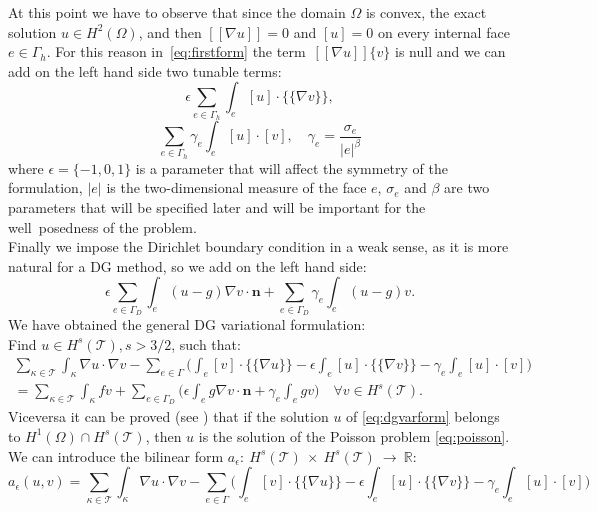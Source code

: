\documentclass[12pt, a4paper]{article}
\theoremstyle{definition}
\theoremstyle{plain}
\theoremstyle{plain}
\theoremstyle{definition}
\begin{document}
At this point we have to observe that since the domain $\Omega$ is convex, the 
exact solution $u \in H^2(\Omega)$, and then $[\![\nabla u]\!] = 0$ and $[u] = 
0$ on every internal face $e \in \Gamma_h$. For this reason 
in~\eqref{eq:firstform} the term~$[\![ \nabla u ]\!] \{v\}$ is null and we can 
add on the left hand side two tunable terms:
\begin{equation*}
	\epsilon \sum_{e \in \Gamma_h} \int_e [u] \cdot \{\!\!\{ \nabla v \}\!\!\},
\end{equation*}
\begin{equation*}
	\sum_{e \in \Gamma_h} \gamma_e \int_e [u] \cdot [v], \quad \gamma_e = 
	\frac{\sigma_e}{|e|^\beta}
\end{equation*}
where $\epsilon = \{-1, 0, 1\}$ is a parameter that will affect the symmetry of 
the formulation, $|e|$ is the two-dimensional measure of the face $e$, 
$\sigma_e$ and $\beta$ are two parameters that will be specified later and will 
be important for the well~posedness of the problem.\\
Finally we impose the Dirichlet boundary condition in a weak sense, as it is 
more natural for a DG method, so we add on the left hand side:
\begin{equation*}
	\epsilon \sum_{e \in \Gamma_D} \int_e (u-g) \nabla v \cdot \mathbf{n}
	+ \sum_{e \in \Gamma_D} \gamma_e \int_e (u-g)v.
\end{equation*}
We have obtained the general DG variational formulation:\\
Find $u \in H^s(\mathcal{T}), s>3/2$, such that:
\begin{multline*}
	\sum_{\kappa \in \mathcal{T}} \int_\kappa \nabla u \cdot \nabla v 
	-\sum_{e \in \Gamma} \bigg( \int_e [v] \cdot \{\!\!\{ \nabla u \}\!\!\}
	-\epsilon \int_e [u] \cdot \{\!\!\{ \nabla v \}\!\!\}
	- \gamma_e \int_e [u] \cdot [v] \bigg)\\
	= \sum_{\kappa \in \mathcal{T}} \int_\kappa fv
	+ \sum_{e \in \Gamma_D} \bigg( \epsilon \int_e g \nabla v \cdot \mathbf{n}
	+ \gamma_e \int_e gv \bigg) \quad \forall v \in H^s(\mathcal{T}).
\end{multline*}
Viceversa it can be proved (see \cite{riviere}) that if the solution 
$u$ of 
\eqref{eq:dgvarform} belongs to $H^1(\Omega) \cap H^s(\mathcal{T})$, then $u$ 
is the solution of the Poisson problem \eqref{eq:poisson}.\\
We can introduce the bilinear form $a_\epsilon:~H^s(\mathcal{T})~\times~H^s(\mathcal{T})~\rightarrow~\mathbb{R}$:
\begin{equation} \label{eq:bilinear}
a_\epsilon(u, v) = \sum_{\kappa \in \mathcal{T}} \int_\kappa \nabla u \cdot \nabla v
-\sum_{e \in \Gamma} \bigg( \int_e [v] \cdot \{\!\!\{ \nabla u \}\!\!\}
-\epsilon \int_e [u] \cdot \{\!\!\{ \nabla v \}\!\!\}
- \gamma_e \int_e [u]\cdot[v] \bigg)
\end{equation}
\end{document}
